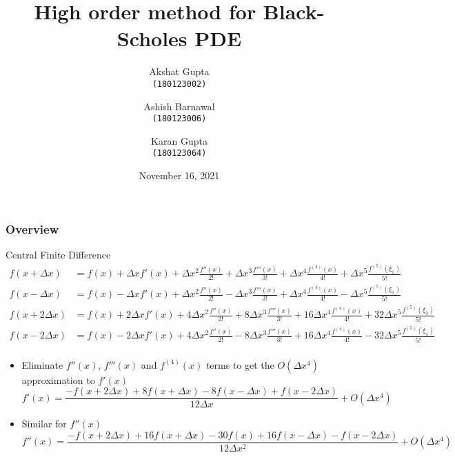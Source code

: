\documentclass{beamer}
\title[MA473 Term Paper]{High order method for Black-Scholes PDE} %
\author{
  Akshat Gupta\\
  \texttt{(180123002)}\\
  \and
  Ashish Barnawal\\
  \texttt{(180123006)}\\
  \and
  Karan Gupta\\
  \texttt{(180123064)}\\
  }
\institute[IITG] %
{
Indian Institute of Technology Guwahati \\ %
}
\date{November 16, 2021} %
\begin{document}
\begin{frame}
\titlepage %
\end{frame}

\begin{frame}
\frametitle{Overview} %
\tableofcontents %
\end{frame}


\begin{frame}{Central Finite Difference}
\tiny
\begin{align*}
f(x+\Delta x) &= f(x) + \Delta x f'(x) + \Delta x^2 \frac{f''(x)}{2!} + \Delta x^3 \frac{f'''(x)}{3!} + \Delta x^4\frac{f^{(4)}(x)}{4!} + \Delta x^5 \frac{f^{(5)}(\xi_1)}{5!}\\
f(x-\Delta x) &= f(x) - \Delta x f'(x) + \Delta x^2 \frac{f''(x)}{2!} - \Delta x^3 \frac{f'''(x)}{3!} + \Delta x^4\frac{f^{(4)}(x)}{4!} - \Delta x^5 \frac{f^{(5)}(\xi_2)}{5!}\\
f(x+2\Delta x) &= f(x) + 2\Delta x f'(x) + 4\Delta x^2 \frac{f''(x)}{2!} + 8\Delta x^3 \frac{f'''(x)}{3!} + 16\Delta x^4\frac{f^{(4)}(x)}{4!} + 32\Delta x^5 \frac{f^{(5)}(\xi_3)}{5!}\\
f(x-2\Delta x) &= f(x) - 2\Delta x f'(x) + 4\Delta x^2 \frac{f''(x)}{2!} - 8\Delta x^3 \frac{f'''(x)}{3!} + 16\Delta x^4\frac{f^{(4)}(x)}{4!} - 32\Delta x^5 \frac{f^{(5)}(\xi_4)}{5!}\\
\end{align*}
\normalsize

\begin{itemize}
    \item Eliminate $f''(x)$, $f'''(x)$ and $f^{(4)}(x)$ terms to get the $O(\Delta x^4)$ approximation to $f'(x)$
    \tiny
    \[
    f'(x) = \frac{-f(x+2\Delta x)+8f(x+\Delta x)-8f(x-\Delta x)+f(x-2\Delta x)}{12\Delta x} + O(\Delta x^4)
    \]
    \normalsize
    \item Similar for $f''(x)$
    \tiny
    \[
    f''(x) = \frac{-f(x+2\Delta x)+16f(x+\Delta x)-30f(x)+16f(x-\Delta x)-f(x-2\Delta x)}{12\Delta x^2} + O(\Delta x^4)
    \]
    \normalsize
\end{itemize}
\end{frame}
\end{document}
